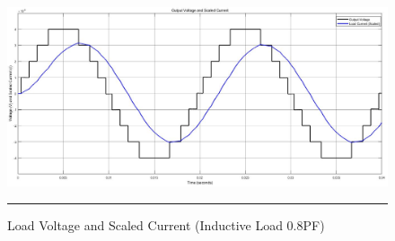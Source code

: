 \begin{figure}[htbp]
	\centering
	\includegraphics[width = 6in]{./Figures/Photos/Simulink/Load_Voltage_Current_Induc.jpg}
	\rule{35em}{1pt}
	\caption{Load Voltage and Scaled Current (Inductive Load 0.8PF)}
\end{figure}
\newpage
